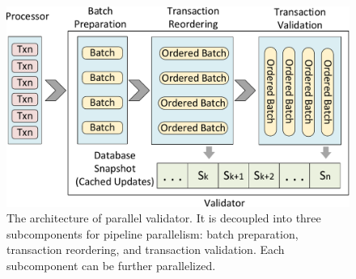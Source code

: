 

\begin{figure}[t]
	\centering
	\includegraphics[width=1\columnwidth]{./figures/validator}
	\vspace{-2em}
	\caption{The architecture of parallel validator. It is decoupled into three subcomponents for pipeline parallelism: batch preparation, transaction reordering, and transaction validation. Each subcomponent can be further parallelized.}
	\vspace{-1em}
	\label{fig:reorder:validator}
\end{figure}

